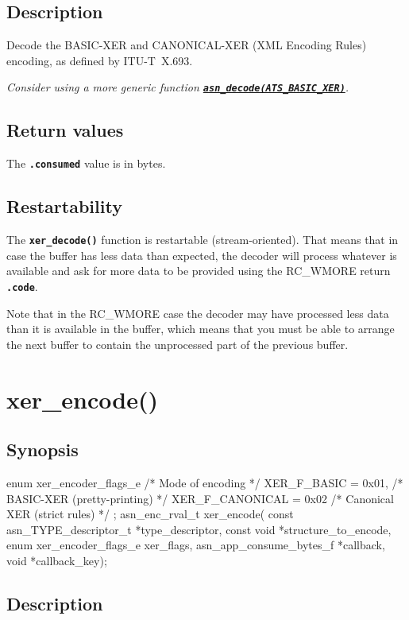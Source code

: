 \documentclass[english,oneside,12pt]{book}
\newcommand{\apisection}[2]{\clearpage\section{\label{#1}#2}}
\newcommand{\api}[2]{\hyperref[#1]{\code{#2}}}
\newcommand{\code}[1]{\texttt{\textbf{\lstinline{#1}}}}
\begin{document}
\subsection*{Description}

Decode the BASIC-XER and CANONICAL-XER (XML Encoding Rules) encoding,
as defined by ITU-T~X.693.\newline

\noindent\emph{Consider using a more generic function \api{sec:asn_decode}{asn_decode(ATS_BASIC_XER)}.}

\subsection*{Return values}


The \code{.consumed} value is in bytes.

\subsection*{Restartability}

The \code{xer_decode()} function is restartable (stream-oriented).
That means that in case the buffer has less data than expected,
the decoder will process whatever is available and ask for more data
to be provided using the RC\_WMORE return \code{.code}.

Note that in the RC\_WMORE case the decoder may have processed less data than
it is available in the buffer, which means that you must be able to arrange
the next buffer to contain the unprocessed part of the previous buffer.

\apisection{sec:xer_encode}{xer\_encode()}

\subsection*{Synopsis}

\begin{signature}
enum xer_encoder_flags_e {
    /* Mode of encoding */
    XER_F_BASIC     = 0x01, /* BASIC-XER (pretty-printing) */
    XER_F_CANONICAL = 0x02  /* Canonical XER (strict rules) */
};
asn_enc_rval_t xer_encode(
    const asn_TYPE_descriptor_t *type_descriptor,
    const void *structure_to_encode,
    enum xer_encoder_flags_e xer_flags,
    asn_app_consume_bytes_f *callback,
    void *callback_key);
\end{signature}

\subsection*{Description}
\end{document}
